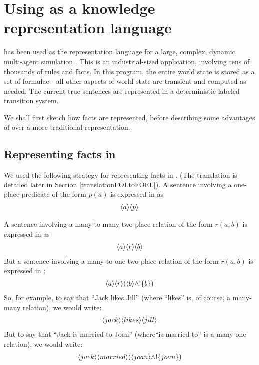 \section{Using \Cathoristic{} as a knowledge representation language}\label{kr}


\Cathoristic{} has been used as the representation language for a
large, complex, dynamic multi-agent simulation \cite{evans-and-short}.
This is an industrial-sized application, involving tens of thousands
of rules and facts.  In this program, the entire world state
is stored as a set of \cathoristic{} formulae - all other aspects of
world state are transient and computed as needed.  The current true
sentences are represented in a deterministic labeled transition
system.

We shall first sketch how facts are represented, before describing some
advantages of \cathoristic{} over a more traditional \fol{}
representation.

\subsection{Representing facts  in \cathoristic{}}

We used the following strategy for representing facts in \cathoristic{}.  
(The translation is detailed later in Section
\ref{translationFOLtoFOEL}).  
A sentence involving a one-place predicate of the form $p(a)$ is
expressed in \cathoristic{} as
\begin{eqnarray*}
   \langle a \rangle \langle p \rangle \end{eqnarray*}

\NI A sentence involving a many-to-many two-place relation of the form
$r(a,b)$ is expressed in \cathoristic{} as
\begin{eqnarray*}
\langle a \rangle \langle r \rangle \langle b \rangle \end{eqnarray*}
But a sentence involving a many-to-one two-place relation of the form $r(a,b)$ is expressed in \cathoristic{}:
\begin{eqnarray*}
\langle a \rangle \langle r \rangle (\langle b \rangle \land ! \{b\})
\end{eqnarray*}
So, for example, to say that ``Jack likes Jill'' (where ``likes'' is, of course, a many-many relation), we would write:
\begin{eqnarray*}
\langle jack \rangle \langle likes \rangle \langle jill \rangle \end{eqnarray*}
But to say that ``Jack is married to Joan'' (where``is-married-to'' is a many-one relation), we would write:
\begin{eqnarray*}
\langle jack \rangle \langle married \rangle (\langle joan \rangle \land ! \{joan\})
\end{eqnarray*}

